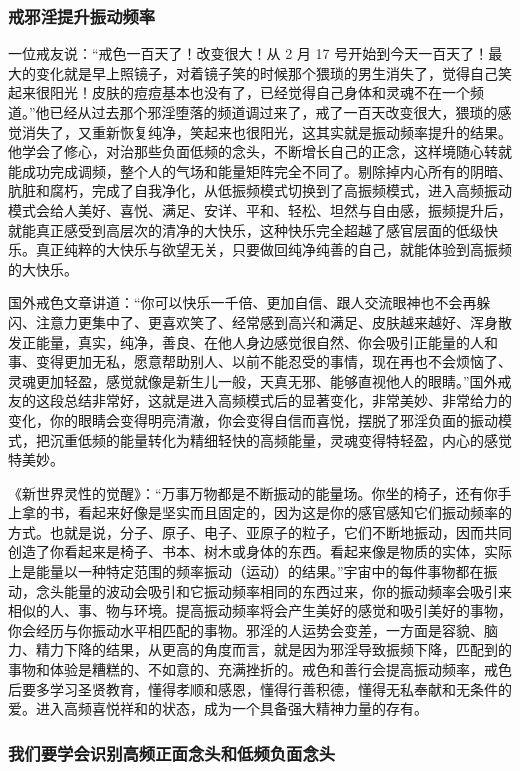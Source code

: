 \subsubsection{戒邪淫提升振动频率}

一位戒友说：“戒色一百天了！改变很大！从 2 月 17 号开始到今天一百天了！最大的变化就是早上照镜子，对着镜子笑的时候那个猥琐的男生消失了，觉得自己笑起来很阳光！皮肤的痘痘基本也没有了，已经觉得自己身体和灵魂不在一个频道。”他已经从过去那个邪淫堕落的频道调过来了，戒了一百天改变很大，猥琐的感觉消失了，又重新恢复纯净，笑起来也很阳光，这其实就是振动频率提升的结果。他学会了修心，对治那些负面低频的念头，不断增长自己的正念，这样境随心转就能成功完成调频，整个人的气场和能量矩阵完全不同了。剔除掉内心所有的阴暗、肮脏和腐朽，完成了自我净化，从低振频模式切换到了高振频模式，进入高频振动模式会给人美好、喜悦、满足、安详、平和、轻松、坦然与自由感，振频提升后，就能真正感受到高层次的清净的大快乐，这种快乐完全超越了感官层面的低级快乐。真正纯粹的大快乐与欲望无关，只要做回纯净纯善的自己，就能体验到高振频的大快乐。

国外戒色文章讲道：“你可以快乐一千倍、更加自信、跟人交流眼神也不会再躲闪、注意力更集中了、更喜欢笑了、经常感到高兴和满足、皮肤越来越好、浑身散发正能量，真实，纯净，善良、在他人身边感觉很自然、你会吸引正能量的人和事、变得更加无私，愿意帮助别人、以前不能忍受的事情，现在再也不会烦恼了、灵魂更加轻盈，感觉就像是新生儿一般，天真无邪、能够直视他人的眼睛。”国外戒友的这段总结非常好，这就是进入高频模式后的显著变化，非常美妙、非常给力的变化，你的眼睛会变得明亮清澈，你会变得自信而喜悦，摆脱了邪淫负面的振动模式，把沉重低频的能量转化为精细轻快的高频能量，灵魂变得特轻盈，内心的感觉特美妙。

《新世界灵性的觉醒》：“万事万物都是不断振动的能量场。你坐的椅子，还有你手上拿的书，看起来好像是坚实而且固定的，因为这是你的感官感知它们振动频率的方式。也就是说，分子、原子、电子、亚原子的粒子，它们不断地振动，因而共同创造了你看起来是椅子、书本、树木或身体的东西。看起来像是物质的实体，实际上是能量以一种特定范围的频率振动（运动）的结果。”宇宙中的每件事物都在振动，念头能量的波动会吸引和它振动频率相同的东西过来，你的振动频率会吸引来相似的人、事、物与环境。提高振动频率将会产生美好的感觉和吸引美好的事物，你会经历与你振动水平相匹配的事物。邪淫的人运势会变差，一方面是容貌、脑力、精力下降的结果，从更高的角度而言，就是因为邪淫导致振频下降，匹配到的事物和体验是糟糕的、不如意的、充满挫折的。戒色和善行会提高振动频率，戒色后要多学习圣贤教育，懂得孝顺和感恩，懂得行善积德，懂得无私奉献和无条件的爱。进入高频喜悦祥和的状态，成为一个具备强大精神力量的存有。

\subsubsection{我们要学会识别高频正面念头和低频负面念头}

